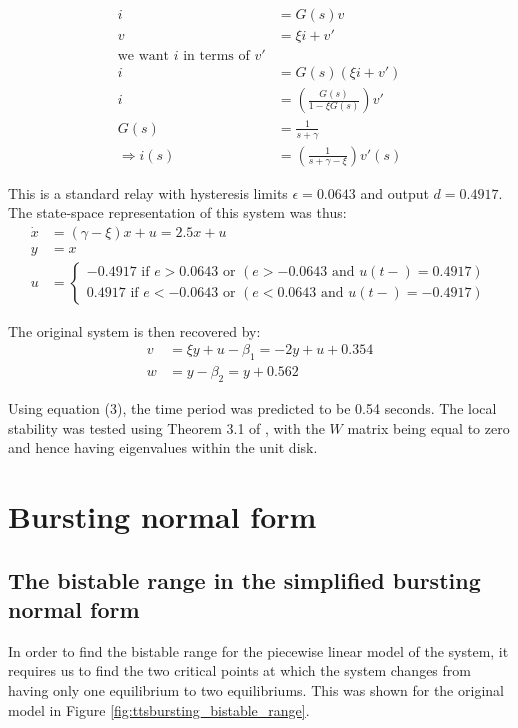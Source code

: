 \documentclass[a4paper, 12pt]{article}
\begin{document}
\begin{appendices}
\begin{align}
i &= G(s)v \\
v &= \xi i + v' \\
\text{we want $i$ in terms of $v'$}\\
i &= G(s)(\xi i + v') \\
i &= \left(\frac{G(s)}{1-\xi G(s)}\right)v'\\
G(s) &= \frac{1}{s + \gamma}\\
\Rightarrow i(s) &= \left(\frac{1}{s+\gamma-\xi}\right)v'(s)
\end{align}

This is a standard relay with hysteresis limits $\epsilon = 0.0643$ and output $d = 0.4917$. The state-space representation of this system was thus:
\begin{align}
\dot{x} &= (\gamma-\xi)x + u = 2.5x + u \\
y &= x \\
u &= \begin{cases}
	               -0.4917 \text{ if } e > 0.0643 \text{ or } (e >-0.0643 \text{ and } u(t-) = 0.4917)\\
	                0.4917 \text{ if } e < -0.0643 \text{ or } (e < 0.0643 \text{ and } u(t-) = -0.4917)	              
	            \end{cases}
\end{align}

The original system is then recovered by:
\begin{align}
v&= \xi y + u - \beta_1 = -2y+u+0.354 \\
w&= y - \beta_2 = y + 0.562 
\end{align}

Using equation (3), the time period was predicted to be 0.54 seconds. The local stability was tested using Theorem 3.1 of \cite{astrom1995}, with the $W$ matrix being equal to zero and hence having eigenvalues within the unit disk. 
\newpage
\section{Bursting normal form}
\subsection{The bistable range in the simplified bursting normal form}

In order to find the bistable range for the piecewise linear model of the system, it requires us to find the two critical points at which the system changes from having only one equilibrium to two equilibriums. This was shown for the original model in Figure \ref{fig:ttsbursting_bistable_range}. 


\end{appendices}
\end{document}
